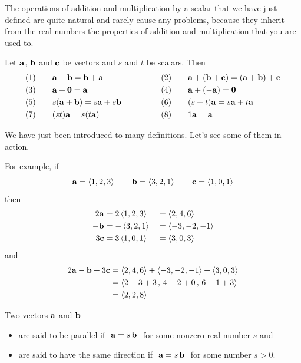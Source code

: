 The operations of addition and multiplication by a scalar that we have just
defined are quite natural and rarely cause any problems, because 
they inherit from the real numbers the properties of  addition and 
multiplication that you are used to. 
\begin{theorem}
                    \label{thm:addScalMult}
Let $\mathbf{a}$, $\mathbf{b}$ and $\mathbf{c}$ be vectors and $s$ and $t$ be scalars. Then 
\begin{alignat*}{5}
& (1)\quad&&\mathbf{a}+\mathbf{b}=\mathbf{b}+\mathbf{a} \qquad\qquad\qquad
&& (2)\quad&&\mathbf{a}+(\mathbf{b}+\mathbf{c})=(\mathbf{a}+\mathbf{b})+\mathbf{c}\\
& (3) &&\mathbf{a}+\mathbf{0} =\mathbf{a} 
&& (4) &&\mathbf{a}+(-\mathbf{a})=\mathbf{0}\\
& (5) &&s(\mathbf{a}+\mathbf{b})=s\mathbf{a}+s\mathbf{b}
&& (6) &&(s+t)\mathbf{a}=s\mathbf{a}+t\mathbf{a}\\
& (7) &&(st)\mathbf{a} = s(t\mathbf{a})
&& (8) &&1\mathbf{a}=\mathbf{a}\\
\end{alignat*}
\end{theorem}

\noindent We have just been introduced to many definitions. Let's
see some of them in action.
\begin{eg}
For example, if 
\begin{equation*}
\mathbf{a} = \left< 1,2,3\right>\qquad
\mathbf{b} = \left< 3,2,1\right>\qquad
\mathbf{c} = \left< 1,0,1\right>
\end{equation*}
then
\begin{alignat*}{3}
2\mathbf{a}&=2\left< 1,2,3\right>&&=\left< 2,4,6\right> \\
-\mathbf{b}&=-\left< 3,2,1\right>&&=\left< -3,-2,-1\right> \\
3\mathbf{c}&=3\left< 1,0,1\right>&&=\left< 3,0,3\right>
\end{alignat*}
and 
\begin{align*}
2\mathbf{a}-\mathbf{b}+3\mathbf{c} 
&= \left< 2,4,6\right> + \left< -3,-2,-1\right>+\left< 3,0,3\right> \\
&= \left< 2-3+3\,,\,4-2+0\,,\,6-1+3\right> \\
&= \left< 2,2,8 \right>
\end{align*}
\end{eg}\goodbreak

\begin{defn}\label{def parallel vectors}
Two vectors $\mathbf{a}$ and $\mathbf{b}$
\begin{itemize}
\item
are said to be parallel if $\ \mathbf{a}= s\,\mathbf{b}\ $ for some nonzero real number $s$ and
\item
are said to have the same direction if $\ \mathbf{a}=s\,\mathbf{b}\ $ for some number $s>0$.
\end{itemize} 
\end{defn}


